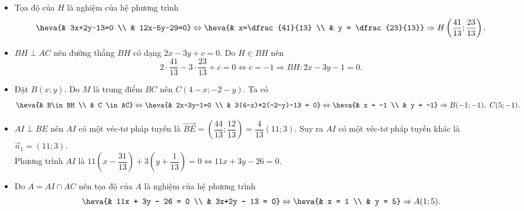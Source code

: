 \begin{bt}
{\begin{itemize}
				$\Rightarrow EM$ có một véc-tơ pháp tuyến $\overrightarrow{n}=(12;-5)$. Phương trình $EM$ là \[ 12(x-2)-5(y+1)=0 \Leftrightarrow 12x-5y-29=0.\]
				\item Tọa độ của $H$ là nghiệm của hệ phương trình \[\heva{& 3x+2y-13=0 \\ & 12x-5y-29=0} \Leftrightarrow \heva{& x=\dfrac{41}{13} \\ & y = \dfrac{23}{13}} \Rightarrow H\left(\dfrac{41}{13};\dfrac{23}{13}\right).\]
				\item $BH\perp AC$ nên đường thẳng $BH$ có dạng $2x-3y+c=0$. Do $H\in BH$ nên
				\[ 2\cdot \dfrac{41}{13} - 3\cdot \dfrac{23}{13} + c = 0 \Leftrightarrow c=-1 \Rightarrow BH \colon 2x-3y-1=0.\]
				\item Đặt $B(x;y)$. Do $M$ là trung điểm $BC$ nên $C(4-x; -2-y)$. Ta có
				\[ \heva{& B\in BH \\ & C \in AC}\Leftrightarrow \heva{& 2x-3y-1=0 \\ & 3(4-x)+2(-2-y)-13 = 0} \Leftrightarrow \heva{& x = -1 \\ & y = -1} \Rightarrow B(-1;-1), \ C(5;-1).\]
				\item $AI \perp BE$ nên $AI$ có một véc-tơ pháp tuyến là $\overrightarrow{BE}=\left(\dfrac{44}{13}; \dfrac{12}{13}\right) = \dfrac{4}{13} (11;3)$. Suy ra $AI$ có một véc-tơ pháp tuyến khác là $\overrightarrow{n}_1=(11;3)$.\\
				Phương trình $AI$ là $11  \left( x  - \dfrac{31}{13} \right) + 3  \left( y + \dfrac{1}{13}\right) = 0 \Leftrightarrow 11x + 3y -26=0$.
				\item Do $A=AI \cap AC$ nên tọa độ của $A$ là nghiệm của hệ phương trình
				\[ \heva{& 11x + 3y - 26 = 0 \\ & 3x+2y - 13 = 0} \Leftrightarrow \heva{& x = 1 \\ & y = 5} \Rightarrow A(1;5).\]
			\end{itemize}
		}
	\end{bt}
